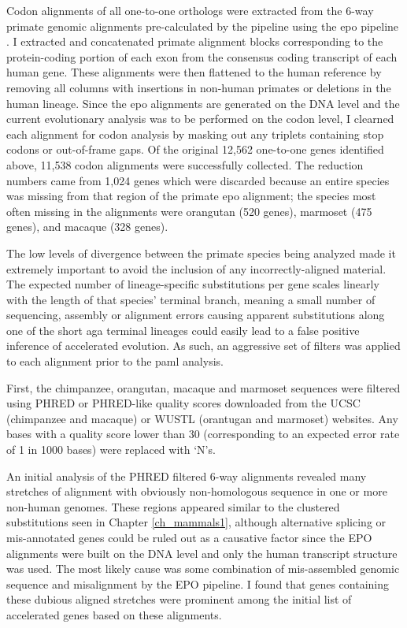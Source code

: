 Codon alignments of all one-to-one orthologs were extracted from the
6-way primate genomic alignments pre-calculated by the \ens pipeline
using the \ac{epo} pipeline \citep{Paten2008a,Paten2008}. I extracted
and concatenated primate alignment blocks corresponding to the
protein-coding portion of each exon from the consensus coding
transcript of each human gene. These alignments were then flattened to
the human reference by removing all columns with insertions in
non-human primates or deletions in the human lineage. Since the
\ac{epo} alignments are generated on the DNA level and the current
evolutionary analysis was to be performed on the codon level, I
clearned each alignment for codon analysis by masking out any triplets
containing stop codons or out-of-frame gaps. Of the original 12,562
one-to-one genes identified above, 11,538 codon alignments were
successfully collected. The reduction numbers came from 1,024 genes
which were discarded because an entire species was missing from that
region of the primate \ac{epo} alignment; the species most often
missing in the alignments were orangutan (520 genes), marmoset (475 genes),
and macaque (328 genes).

The low levels of divergence between the primate species being
analyzed made it extremely important to avoid the inclusion of any
incorrectly-aligned material. The expected number of lineage-specific
substitutions per gene scales linearly with the length of that
species' terminal branch, meaning a small number of sequencing,
assembly or alignment errors causing apparent \nsyn substitutions
along one of the short \ac{aga} terminal lineages could easily lead to
a false positive inference of accelerated evolution. As such, an
aggressive set of filters was applied to each alignment prior to the
\ac{paml} analysis.

First, the chimpanzee, orangutan, macaque and marmoset sequences were
filtered using PHRED or PHRED-like quality scores downloaded from the
UCSC (chimpanzee and macaque) or WUSTL (orantugan and marmoset)
websites. Any bases with a quality score lower than 30 (corresponding
to an expected error rate of 1 in 1000 bases) were replaced with `N's.

An initial analysis of the PHRED filtered 6-way alignments revealed
many stretches of alignment with obviously non-homologous sequence in
one or more non-human genomes. These regions appeared similar to the
clustered substitutions seen in Chapter \ref{ch_mammals1}, although
alternative splicing or mis-annotated genes could be ruled out as a
causative factor since the EPO alignments were built on the DNA level
and only the human transcript structure was used. The most likely
cause was some combination of mis-assembled genomic sequence and
misalignment by the EPO pipeline. I found that genes containing these
dubious aligned stretches were prominent among the initial list of
accelerated genes based on these alignments.

